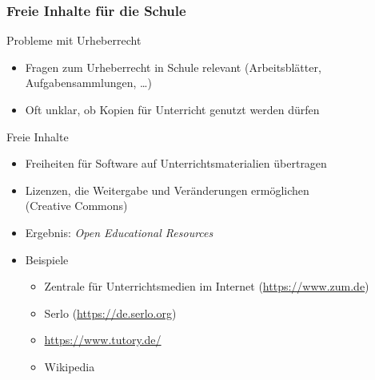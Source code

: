 \documentclass{beamer}
\begin{document}
\begin{frame}
  \frametitle{Freie Inhalte für die Schule}

  \onslide<+->

  \begin{block}{Probleme mit Urheberrecht}
    \begin{itemize}
    \item Fragen zum Urheberrecht in Schule relevant (Arbeitsblätter,
      Aufgabensammlungen, \dots)
    \item Oft unklar, ob Kopien für Unterricht genutzt werden dürfen
    \end{itemize}
  \end{block}

  \onslide<+->

  \begin{block}{Freie Inhalte}
    \begin{itemize}
    \item Freiheiten für Software auf Unterrichtsmaterialien übertragen
    \item Lizenzen, die Weitergabe und Veränderungen ermöglichen \\
      (Creative Commons)
    \item Ergebnis: \emph{Open Educational Resources}
    \item Beispiele
      \begin{itemize}
      \item Zentrale für Unterrichtsmedien im Internet
        (\url{https://www.zum.de})
      \item Serlo (\url{https://de.serlo.org})
      \item \url{https://www.tutory.de/}
      \item Wikipedia
      \end{itemize}
    \end{itemize}
  \end{block}

\end{frame}
\end{document}
